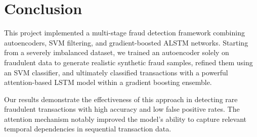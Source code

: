 \section{Conclusion}
This project implemented a multi-stage fraud detection framework combining autoencoders, SVM filtering, and gradient-boosted ALSTM networks. Starting from a severely imbalanced dataset, we trained an autoencoder solely on fraudulent data to generate realistic synthetic fraud samples, refined them using an SVM classifier, and ultimately classified transactions with a powerful attention-based LSTM model within a gradient boosting ensemble.

Our results demonstrate the effectiveness of this approach in detecting rare fraudulent transactions with high accuracy and low false positive rates. The attention mechanism notably improved the model's ability to capture relevant temporal dependencies in sequential transaction data.

